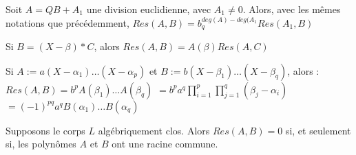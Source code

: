 \begin{prop}
Soit $A=QB+A_1$ une division euclidienne, avec $A_1 \neq 0$. Alors, avec les mêmes notations que précédemment, $Res(A,B)=b_q^{deg(A)-deg(A_1} Res(A_1,B)$
\end{prop}
\begin{Lemme}
Si $B=(X-\beta)*C$, alors $Res(A,B)=A(\beta)Res(A,C)$
\end{Lemme}
\begin{Thm}
Si $A:=a(X-\alpha_1)\ldots (X-\alpha_p)$ et $B:=b(X-\beta_1)\ldots(X-\beta_q)$, alors :
$Res(A,B)=b^pA(\beta_1)\ldots A(\beta_q)$
$=b^pa^q \prod_{i=1}^p \prod_{j=1}^q (\beta_j-\alpha_i)$
$=(-1)^{pq} a^q B(\alpha_1) \ldots B(\alpha_q)$
\end{Thm}
\begin{cor}
Supposons le corps $L$ algébriquement clos. Alors $Res(A,B)=0$ si, et seulement si, les polynômes $A$ et $B$ ont une racine commune.
\end{cor}

